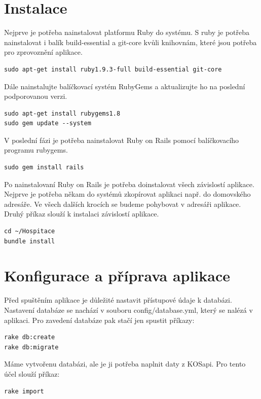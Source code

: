 \section{Instalace}
Nejprve je potřeba nainstalovat platformu Ruby do systému. S ruby je potřeba nainstalovat i balík build-essential a git-core kvůli  knihovnám, které jsou potřeba pro zprovoznění aplikace. 

\begin{verbatim}
sudo apt-get install ruby1.9.3-full build-essential git-core
\end{verbatim}

Dále nainstalujte balíčkovací systém RubyGems a aktualizujte ho na poslední podporovanou verzi.
\begin{verbatim}
sudo apt-get install rubygems1.8
sudo gem update --system
\end{verbatim}

V poslední fázi je potřeba nainstalovat Ruby on Rails pomocí balíčkovacího programu rubygems.

\begin{verbatim}
sudo gem install rails
\end{verbatim}

Po nainstalovaní Ruby on Rails je potřeba doinstalovat všech závislostí aplikace. Nejprve je potřeba někam do systémů zkopírovat aplikaci např. do domovského adresáře. Ve všech dalších krocích se budeme pohybovat v adresáři aplikace. Druhý příkaz slouží k instalaci závislostí aplikace.

\begin{verbatim}
cd ~/Hospitace
bundle install
\end{verbatim}  

\section{Konfigurace a příprava aplikace}
Před spuštěním aplikace je důležité nastavit přístupové údaje k databázi. Nastavení databáze se nachází v souboru config/database.yml, který se nalézá v aplikaci. Pro zavedení databáze pak stačí jen spustit příkazy:

\begin{verbatim}
rake db:create
rake db:migrate
\end{verbatim}  

Máme vytvořenu databázi, ale je ji potřeba naplnit daty z KOSapi. Pro tento účel slouží příkaz:

\begin{verbatim}
rake import
\end{verbatim}

